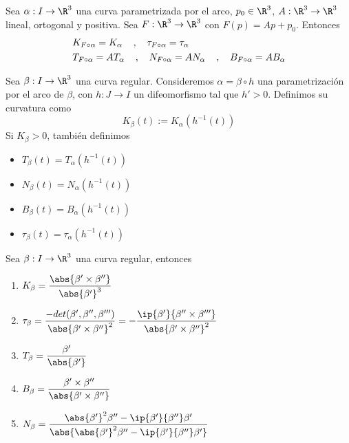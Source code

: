 \documentclass{article}
\begin{document}
\begin{prop}
    Sea $\alpha: I\to\R^{3}$ una curva parametrizada por el arco, $p_{0}\in\R^{3}$, 
    $A:\R^{3}\to\R^{3}$ lineal, ortogonal y positiva. Sea $F:\R^{3}\to\R^{3}$ con 
    $F(p)=Ap+p_{0}$. Entonces
    \begin{align*}
        & K_{F\circ\alpha}=K_{\alpha}\hspace{4mm}\text{,}\hspace{4mm}\tau_{F\circ\alpha}=
        \tau_{\alpha} \\
        & T_{F\circ\alpha}=AT_{\alpha}\hspace{4mm}\text{,}\hspace{4mm}
        N_{F\circ\alpha}=AN_{\alpha}\hspace{4mm}\text{,}\hspace{4mm}
        B_{F\circ\alpha}=AB_{\alpha}
    \end{align*}
\end{prop}

\begin{dfn}
    Sea $\beta:I\to\R^{3}$ una curva regular. Consideremos $\alpha=\beta\circ h$ una 
    parametrización por el arco de $\beta$, con $h:J\to I$ un difeomorfismo tal que $h'>0$.
    Definimos su curvatura como
    \begin{equation*}
        K_{\beta}(t):=K_{\alpha}(h^{-1}(t))
    \end{equation*}
    Si $K_{\beta}>0$, también definimos
    \begin{itemize}
        \item $T_{\beta}(t)=T_{\alpha}(h^{-1}(t))$
        \item $N_{\beta}(t)=N_{\alpha}(h^{-1}(t))$
        \item $B_{\beta}(t)=B_{\alpha}(h^{-1}(t))$
        \item $\tau_{\beta}(t)=\tau_{\alpha}(h^{-1}(t))$
    \end{itemize}
\end{dfn}

\begin{prop}
    Sea $\beta: I\to\R^{3}$ una curva regular, entonces
    \begin{enumerate}
        \item $K_{\beta}=\dfrac{\abs{\beta'\times\beta''}}{\abs{\beta'}^{3}}$
        \item $\tau_{\beta}=\dfrac{-det(\beta',\beta'',\beta''')}{\abs{\beta'\times\beta''}^{2}}=
        -\dfrac{\ip{\beta'}{\beta''\times\beta'''}}{\abs{\beta'\times\beta''}^{2}}$
        \item $T_{\beta}=\dfrac{\beta'}{\abs{\beta'}}$
        \item $B_{\beta}=\dfrac{\beta'\times\beta''}{\abs{\beta'\times\beta''}}$
        \item $N_{\beta}=\dfrac{\abs{\beta'}^{2}\beta''-\ip{\beta'}{\beta''}\beta'}
        {\abs{\abs{\beta'}^{2}\beta''-\ip{\beta'}{\beta''}\beta'}}$
    \end{enumerate}
\end{prop}
\end{document}
